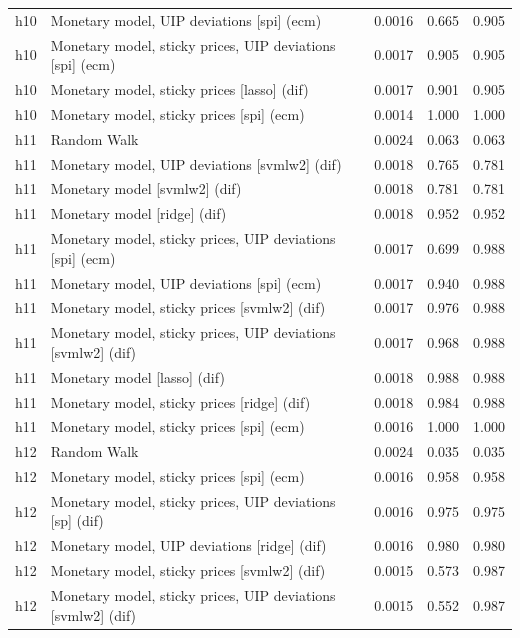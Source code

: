 \begin{ThreePartTable}
\begin{longtable}[t]{cp{5.5cm}ccc}
h10 & \raggedright Monetary model, UIP deviations [spi] (ecm) & 0.0016 & 0.665 & 0.905\\
h10 & \raggedright Monetary model, sticky prices, UIP deviations [spi] (ecm) & 0.0017 & 0.905 & 0.905\\
h10 & \raggedright Monetary model, sticky prices [lasso] (dif) & 0.0017 & 0.901 & 0.905\\
h10 & \raggedright Monetary model, sticky prices [spi] (ecm) & 0.0014 & 1.000 & 1.000\\
\addlinespace
h11 & \raggedright Random Walk & 0.0024 & 0.063 & 0.063\\
h11 & \raggedright Monetary model, UIP deviations [svmlw2] (dif) & 0.0018 & 0.765 & 0.781\\
h11 & \raggedright Monetary model [svmlw2] (dif) & 0.0018 & 0.781 & 0.781\\
h11 & \raggedright Monetary model [ridge] (dif) & 0.0018 & 0.952 & 0.952\\
h11 & \raggedright Monetary model, sticky prices, UIP deviations [spi] (ecm) & 0.0017 & 0.699 & 0.988\\
h11 & \raggedright Monetary model, UIP deviations [spi] (ecm) & 0.0017 & 0.940 & 0.988\\
h11 & \raggedright Monetary model, sticky prices [svmlw2] (dif) & 0.0017 & 0.976 & 0.988\\
h11 & \raggedright Monetary model, sticky prices, UIP deviations [svmlw2] (dif) & 0.0017 & 0.968 & 0.988\\
h11 & \raggedright Monetary model [lasso] (dif) & 0.0018 & 0.988 & 0.988\\
h11 & \raggedright Monetary model, sticky prices [ridge] (dif) & 0.0018 & 0.984 & 0.988\\
h11 & \raggedright Monetary model, sticky prices [spi] (ecm) & 0.0016 & 1.000 & 1.000\\
\addlinespace
h12 & \raggedright Random Walk & 0.0024 & 0.035 & 0.035\\
h12 & \raggedright Monetary model, sticky prices [spi] (ecm) & 0.0016 & 0.958 & 0.958\\
h12 & \raggedright Monetary model, sticky prices, UIP deviations [sp] (dif) & 0.0016 & 0.975 & 0.975\\
h12 & \raggedright Monetary model, UIP deviations [ridge] (dif) & 0.0016 & 0.980 & 0.980\\
h12 & \raggedright Monetary model, sticky prices [svmlw2] (dif) & 0.0015 & 0.573 & 0.987\\
h12 & \raggedright Monetary model, sticky prices, UIP deviations [svmlw2] (dif) & 0.0015 & 0.552 & 0.987\\

\end{longtable}
\end{ThreePartTable}
